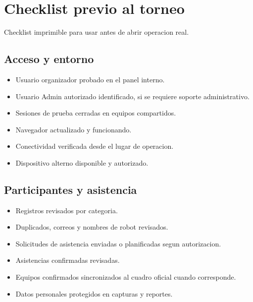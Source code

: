 \chapter{Checklist previo al torneo}
\label{anexo:checklist-previo}

Checklist imprimible para usar antes de abrir operacion real.

\section*{Acceso y entorno}
\begin{itemize}
    \item[\casilla] Usuario organizador probado en el panel interno.
    \item[\casilla] Usuario Admin autorizado identificado, si se requiere soporte administrativo.
    \item[\casilla] Sesiones de prueba cerradas en equipos compartidos.
    \item[\casilla] Navegador actualizado y funcionando.
    \item[\casilla] Conectividad verificada desde el lugar de operacion.
    \item[\casilla] Dispositivo alterno disponible y autorizado.
\end{itemize}

\section*{Participantes y asistencia}
\begin{itemize}
    \item[\casilla] Registros revisados por categoria.
    \item[\casilla] Duplicados, correos y nombres de robot revisados.
    \item[\casilla] Solicitudes de asistencia enviadas o planificadas segun autorizacion.
    \item[\casilla] Asistencias confirmadas revisadas.
    \item[\casilla] Equipos confirmados sincronizados al cuadro oficial cuando corresponde.
    \item[\casilla] Datos personales protegidos en capturas y reportes.
\end{itemize}

